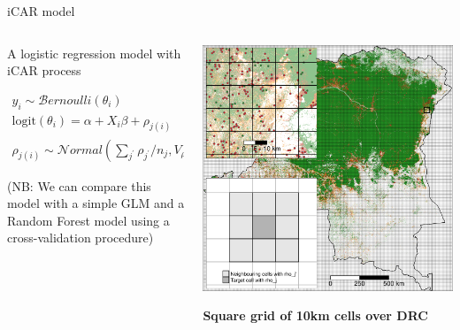 \documentclass[10pt,table,dvipsnames,compress]{beamer}
\begin{document}
\begin{frame}[label={sec:orgd4bc244}]{iCAR model}
\begin{columns}
\begin{column}{0.5\columnwidth}
A logistic regression model with iCAR process

\begin{equation*}
\begin{split}
  y_i \sim \mathcal{B}ernoulli(\theta_i)\\
  \text{logit}(\theta_i) = \alpha + X_i \beta + \rho_{j(i)}\\
  \rho_{j(i)} \sim \mathcal{N}ormal(\sum_{j^{\prime}} \rho_{j^{\prime}} / n_j,V_{\rho} / n_j)
\end{split}
\end{equation*}

\footnotesize (NB: We can compare this model with a simple GLM and a Random
Forest model using a cross-validation procedure)
\end{column}

\begin{column}{0.5\columnwidth}
\begin{center}
\includegraphics[width=\textwidth]{figs/sm/grid.png}
\end{center}

\textbf{Square grid of 10km cells over DRC}
\end{column}
\end{columns}
\end{frame}
\end{document}
